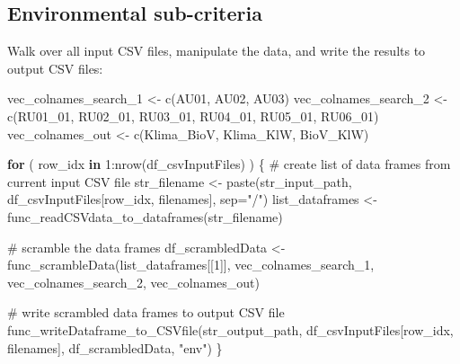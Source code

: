 \documentclass[
]{article}
\newenvironment{Shaded}{\begin{snugshade}}{\end{snugshade}}
\newcommand{\AttributeTok}[1]{\textcolor[rgb]{0.00,0.34,0.68}{#1}}
\newcommand{\CommentTok}[1]{\textcolor[rgb]{0.54,0.53,0.53}{#1}}
\newcommand{\ControlFlowTok}[1]{\textcolor[rgb]{0.12,0.11,0.11}{\textbf{#1}}}
\newcommand{\DecValTok}[1]{\textcolor[rgb]{0.69,0.50,0.00}{#1}}
\newcommand{\FunctionTok}[1]{\textcolor[rgb]{0.39,0.29,0.61}{#1}}
\newcommand{\NormalTok}[1]{\textcolor[rgb]{0.12,0.11,0.11}{#1}}
\newcommand{\OtherTok}[1]{\textcolor[rgb]{0.00,0.43,0.16}{#1}}
\newcommand{\SpecialCharTok}[1]{\textcolor[rgb]{0.24,0.68,0.91}{#1}}
\newcommand{\StringTok}[1]{\textcolor[rgb]{0.75,0.01,0.01}{#1}}
\begin{document}
\hypertarget{environmental-sub-criteria}{%
\subsection{Environmental
sub-criteria}\label{environmental-sub-criteria}}

Walk over all input CSV files, manipulate the data, and write the
results to output CSV files:

\begin{Shaded}
\begin{Highlighting}[]
\NormalTok{vec\_colnames\_search\_1 }\OtherTok{\textless{}{-}} \FunctionTok{c}\NormalTok{(}\StringTok{\textquotesingle{}AU01\textquotesingle{}}\NormalTok{, }\StringTok{\textquotesingle{}AU02\textquotesingle{}}\NormalTok{, }\StringTok{\textquotesingle{}AU03\textquotesingle{}}\NormalTok{)}
\NormalTok{vec\_colnames\_search\_2 }\OtherTok{\textless{}{-}} \FunctionTok{c}\NormalTok{(}\StringTok{\textquotesingle{}RU01\_01\textquotesingle{}}\NormalTok{, }\StringTok{\textquotesingle{}RU02\_01\textquotesingle{}}\NormalTok{, }\StringTok{\textquotesingle{}RU03\_01\textquotesingle{}}\NormalTok{, }\StringTok{\textquotesingle{}RU04\_01\textquotesingle{}}\NormalTok{, }\StringTok{\textquotesingle{}RU05\_01\textquotesingle{}}\NormalTok{, }\StringTok{\textquotesingle{}RU06\_01\textquotesingle{}}\NormalTok{)}
\NormalTok{vec\_colnames\_out }\OtherTok{\textless{}{-}} \FunctionTok{c}\NormalTok{(}\StringTok{\textquotesingle{}Klima\_BioV\textquotesingle{}}\NormalTok{, }\StringTok{\textquotesingle{}Klima\_KlW\textquotesingle{}}\NormalTok{, }\StringTok{\textquotesingle{}BioV\_KlW\textquotesingle{}}\NormalTok{)}

\ControlFlowTok{for}\NormalTok{ ( row\_idx }\ControlFlowTok{in} \DecValTok{1}\SpecialCharTok{:}\FunctionTok{nrow}\NormalTok{(df\_csvInputFiles) ) \{}
  \CommentTok{\# create list of data frames from current input CSV file}
\NormalTok{  str\_filename }\OtherTok{\textless{}{-}} \FunctionTok{paste}\NormalTok{(str\_input\_path, df\_csvInputFiles[row\_idx, filenames], }\AttributeTok{sep=}\StringTok{"/"}\NormalTok{)}
\NormalTok{  list\_dataframes }\OtherTok{\textless{}{-}} \FunctionTok{func\_readCSVdata\_to\_dataframes}\NormalTok{(str\_filename)}
  
  \CommentTok{\# scramble the data frames}
\NormalTok{  df\_scrambledData }\OtherTok{\textless{}{-}} \FunctionTok{func\_scrambleData}\NormalTok{(list\_dataframes[[}\DecValTok{1}\NormalTok{]], vec\_colnames\_search\_1, vec\_colnames\_search\_2, vec\_colnames\_out)}
  
  \CommentTok{\# write scrambled data frames to output CSV file}
  \FunctionTok{func\_writeDataframe\_to\_CSVfile}\NormalTok{(str\_output\_path, df\_csvInputFiles[row\_idx, filenames], df\_scrambledData, }\StringTok{"env"}\NormalTok{)}
\NormalTok{\}}
\end{Highlighting}
\end{Shaded}
\end{document}
